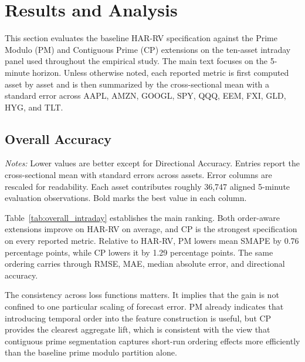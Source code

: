 ﻿\documentclass[a4paper]{article}
\begin{document}
\section{Results and Analysis}
\captionsetup{font=small,labelfont=bf,labelsep=period,hypcap=false}

\noindent
This section evaluates the baseline HAR-RV specification against the Prime Modulo (PM) and Contiguous Prime (CP) extensions on the ten-asset intraday panel used throughout the empirical study. The main text focuses on the 5-minute horizon. Unless otherwise noted, each reported metric is first computed asset by asset and is then summarized by the cross-sectional mean with a standard error across AAPL, AMZN, GOOGL, SPY, QQQ, EEM, FXI, GLD, HYG, and TLT.

\subsection{Overall Accuracy}

{\renewcommand{\thetable}{1A}
\begin{center}
\label{tab:overall_intraday}
\small
\renewcommand{\arraystretch}{1.15}
\setlength{\tabcolsep}{6pt}
\resizebox{0.98\textwidth}{!}{}

\vspace{0.1cm}
\footnotesize \parbox{0.92\textwidth}{\textit{Notes:} Lower values are better except for Directional Accuracy. Entries report the cross-sectional mean with standard errors across assets. Error columns are rescaled for readability. Each asset contributes roughly 36,747 aligned 5-minute evaluation observations. Bold marks the best value in each column.}
\end{center}}

\noindent
Table~\ref{tab:overall_intraday} establishes the main ranking. Both order-aware extensions improve on HAR-RV on average, and CP is the strongest specification on every reported metric. Relative to HAR-RV, PM lowers mean SMAPE by 0.76 percentage points, while CP lowers it by 1.29 percentage points. The same ordering carries through RMSE, MAE, median absolute error, and directional accuracy.

\noindent
The consistency across loss functions matters. It implies that the gain is not confined to one particular scaling of forecast error. PM already indicates that introducing temporal order into the feature construction is useful, but CP provides the clearest aggregate lift, which is consistent with the view that contiguous prime segmentation captures short-run ordering effects more efficiently than the baseline prime modulo partition alone.
\end{document}
